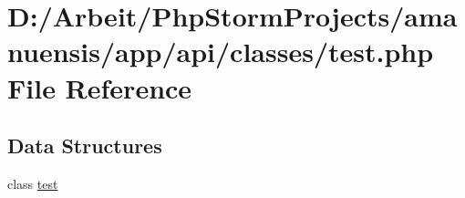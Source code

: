 \hypertarget{a00076}{}\section{D\+:/\+Arbeit/\+Php\+Storm\+Projects/amanuensis/app/api/classes/test.php File Reference}
\label{a00076}
\subsection*{Data Structures}
\begin{DoxyCompactItemize}
\item 
class \hyperlink{a00046}{test}
\end{DoxyCompactItemize}
